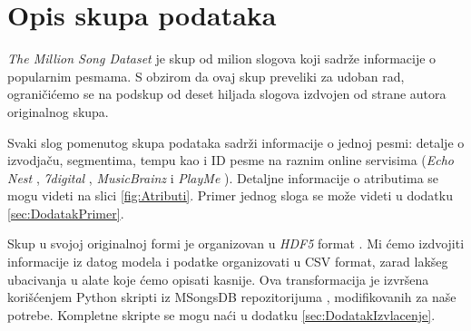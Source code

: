 \section{Opis skupa podataka}
\label{sec:Opis skupa podataka}

\emph{The Million Song Dataset} \cite{Dataset} je skup od milion slogova koji sadr\v{z}e informacije o popularnim pesmama. S obzirom da ovaj skup preveliki za udoban rad, ograni\v{c}i\'c{}emo se na podskup od deset hiljada slogova izdvojen od strane autora originalnog skupa.

Svaki slog pomenutog skupa podataka sadr\v{z}i informacije o jednoj pesmi: detalje o izvodja\v{c}u, segmentima, tempu kao i ID pesme na raznim online servisima (\emph{Echo Nest} \cite{EchoNest}, \emph{7digital} \cite{7digital},  \emph{MusicBrainz} \cite{MusicBrainz} i \emph{PlayMe} \cite{PlayMe}). Detaljne informacije o atributima se mogu videti na slici \ref{fig:Atributi}. Primer jednog sloga se mo\v{z}e videti u dodatku \ref{sec:DodatakPrimer}.

Skup u svojoj originalnoj formi je organizovan u \emph{HDF5} format \cite{HDF5}. Mi \'c{}emo izdvojiti informacije iz datog modela i podatke organizovati u CSV format, zarad lak\v{s}eg ubacivanja u alate koje \'c{}emo opisati kasnije. Ova transformacija je izvr\v{s}ena kori\v{s}\'c{}enjem Python skripti iz MSongsDB repozitorijuma \cite{MSongsDB}, modifikovanih za na\v{s}e potrebe. Kompletne skripte se mogu na\'c{}i u dodatku \ref{sec:DodatakIzvlacenje}.
